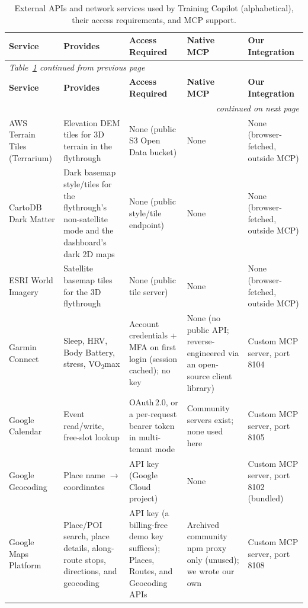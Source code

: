 \begin{landscape}
\small
\begin{longtable}{p{2.6cm}p{3.8cm}p{4.2cm}p{3.2cm}p{3.2cm}}
\caption[External API overview]{External APIs and network services used by Training Copilot (alphabetical), their access requirements, and MCP support.}\label{tab:api_overview}\\
\toprule
\textbf{Service} & \textbf{Provides} & \textbf{Access Required} & \textbf{Native MCP} & \textbf{Our Integration} \\
\midrule
\endfirsthead
\multicolumn{5}{l}{\textit{Table~\ref{tab:api_overview} continued from previous page}} \\
\toprule
\textbf{Service} & \textbf{Provides} & \textbf{Access Required} & \textbf{Native MCP} & \textbf{Our Integration} \\
\midrule
\endhead
\midrule
\multicolumn{5}{r}{\textit{continued on next page}} \\
\endfoot
\botrule
\endlastfoot
AWS Terrain Tiles (Terrarium) & Elevation DEM tiles for 3D terrain in the flythrough & None (public S3 Open Data bucket) & None & None (browser-fetched, outside MCP) \\
\addlinespace
CartoDB Dark Matter & Dark basemap style/tiles for the flythrough's non-satellite mode and the dashboard's dark 2D maps & None (public style/tile endpoint) & None & None (browser-fetched, outside MCP) \\
\addlinespace
ESRI World Imagery & Satellite basemap tiles for the 3D flythrough & None (public tile server) & None & None (browser-fetched, outside MCP) \\
\addlinespace
Garmin Connect & Sleep, HRV, Body Battery, stress, VO\textsubscript{2}max & Account credentials + MFA on first login (session cached); no key & None (no public API; reverse-engineered via an open-source client library) & Custom MCP server, port 8104 \\
\addlinespace
Google Calendar & Event read/write, free-slot lookup & OAuth\,2.0, or a per-request bearer token in multi-tenant mode & Community servers exist; none used here & Custom MCP server, port 8105 \\
\addlinespace
Google Geocoding & Place name $\to$ coordinates & API key (Google Cloud project) & None & Custom MCP server, port 8102 (bundled) \\
\addlinespace
Google Maps Platform & Place/POI search, place details, along-route stops, directions, and geocoding & API key (a billing-free demo key suffices); Places, Routes, and Geocoding APIs & Archived community npm proxy only (unused); we wrote our own & Custom MCP server, port 8108 \\

\end{longtable}
\end{landscape}
